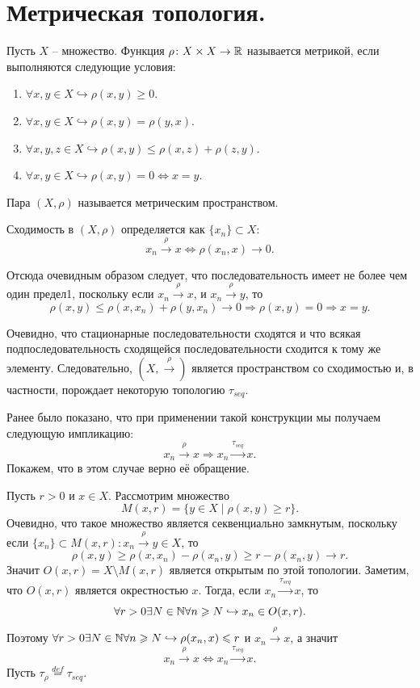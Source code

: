 \section{Метрическая топология.}
\begin{example}
    Пусть $X$ -- множество.
    Функция $\rho\colon X \times X \to \mathbb{R}$
    называется метрикой, если выполняются следующие условия:
    \begin{enumerate}
        \item $\forall x, y \in X \hookrightarrow \rho(x, y) \geq 0$.
        \item $\forall x, y \in X \hookrightarrow \rho(x, y) = \rho(y, x)$.
        \item $\forall x, y, z \in X \hookrightarrow \rho(x, y) \leq \rho(x, z) + \rho(z, y)$.
        \item $\forall x, y \in X \hookrightarrow \rho(x, y) = 0 \Longleftrightarrow x = y$.
    \end{enumerate}
    Пара $(X, \rho)$ называется метрическим пространством.

    Сходимость в $(X, \rho)$ определяется как $\{x_n\} \subset X\colon$
    \[
        x_n \xrightarrow{\rho} x \Longleftrightarrow \rho(x_n, x) \rightarrow 0.
    \]

    Отсюда очевидным образом следует, что последовательность имеет не более чем один предел1, поскольку если $x_n \xrightarrow{\rho} x$, и $x_n \xrightarrow{\rho} y$, то
    \[
        \rho(x, y) \leq \rho(x, x_n) + \rho(y, x_n) \rightarrow 0 \Rightarrow \rho(x, y) = 0 \Rightarrow x = y.
    \]

    Очевидно, что стационарные последовательности сходятся и что всякая подпоследовательность сходящейся последовательности сходится к тому же элементу.
    Следовательно, $(X, \xrightarrow{\rho})$ является пространством со сходимостью и, в частности, порождает некоторую топологию $\tau_{seq}$.

    Ранее было показано, что при применении такой конструкции мы получаем следующую импликацию:
    \[
        x_n \xrightarrow{\rho} x \Rightarrow x_n \xrightarrow{\tau_{seq}} x.
    \]
    Покажем, что в этом случае верно её обращение.

    Пусть $r > 0$ и $x \in X$.
    Рассмотрим множество
    \[
        M(x, r) = \{y \in X \mid \rho(x, y) \geq r\}.
    \]
    Очевидно, что такое множество является секвенциально замкнутым, поскольку если $\{x_n\} \subset M(x, r)\colon x_n \xrightarrow{\rho} y \in X$, то
    \[
        \rho(x, y) \geq \rho(x, x_n) - \rho(x_n, y) \geq r - \rho(x_n, y) \rightarrow r.
    \]
    Значит $O(x, r) = X \setminus M(x, r)$ является открытым по этой топологии.
    Заметим, что $O(x, r)$ является окрестностью $x$.
    Тогда, если $x_n \xrightarrow{\tau_{seq}} x$, то
    \[
        \forall r > 0 \exists N \in \mathbb{N}  \forall n \geqslant N \hookrightarrow x_n \in O(x, r).
    \]
    Поэтому $\forall r > 0 \exists N \in \mathbb{N} \forall n \geqslant N \hookrightarrow \rho(x_n, x) \leqslant r$ и $x_n \xrightarrow{\rho} x$, а значит
    \[
        x_n \xrightarrow{\rho} x \Longleftrightarrow x_n \xrightarrow{\tau_{seq}} x.
    \]
    Пусть $\tau_\rho \stackrel{def}{=} \tau_{seq}$.
\end{example}